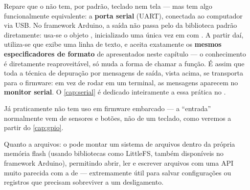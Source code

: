 Repare que o \ESP{} não tem, por padrão, teclado nem tela — mas tem algo funcionalmente equivalente: a \textbf{porta serial} (UART), conectada ao computador via USB. No framework Arduino, a saída não passa pelo  da biblioteca padrão diretamente: usa-se o objeto , inicializado uma única vez em  com . A partir daí, utiliza-se  que exibe uma linha de texto, e  aceita exatamente os \textbf{mesmos especificadores de formato} de  apresentados neste capítulo — o conhecimento é diretamente reaproveitável, só muda a forma de chamar a função. É assim que toda a técnica de depuração por mensagens de saída, vista acima, se transporta para o firmware: em vez de rodar em um terminal, as mensagens \code{[DEBUG]} aparecem no \textbf{monitor serial}. O \cref{cap:serial} é dedicado inteiramente a essa prática no \ESP{}.

Já  praticamente não tem uso em firmware embarcado — a ``entrada'' normalmente vem de sensores e botões, não de um teclado, como veremos a partir do \cref{cap:gpio}.

Quanto a arquivos: o \ESP{} pode montar um sistema de arquivos dentro da própria memória flash (usando bibliotecas como LittleFS, também disponíveis no framework Arduino), permitindo abrir, ler e escrever arquivos com uma API muito parecida com a de  — extremamente útil para salvar configurações ou registros que precisam sobreviver a um desligamento.
